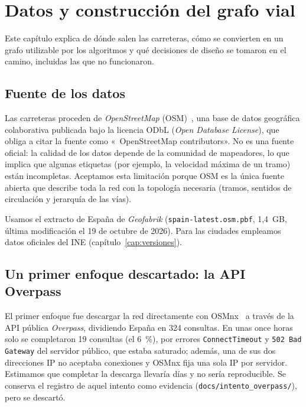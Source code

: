 \chapter{Datos y construcción del grafo vial}\label{cap:grafo}

Este capítulo explica de dónde salen las carreteras, cómo se convierten en un grafo utilizable por los algoritmos y qué decisiones de diseño se tomaron en el
camino, incluidas las que no funcionaron.

\section{Fuente de los datos}

Las carreteras proceden de \emph{OpenStreetMap} (OSM)~\cite{haklay2008}, una base de datos geográfica colaborativa publicada bajo la licencia ODbL (\emph{Open Database License}), que obliga a citar la
fuente como «\textcopyright\ OpenStreetMap contributors». No es una fuente oficial: la calidad de los datos depende de la comunidad de mapeadores, lo que implica
que algunas etiquetas (por ejemplo, la velocidad máxima de un tramo) están incompletas. Aceptamos esta limitación porque OSM es la única fuente abierta que describe toda la red
con la topología necesaria (tramos, sentidos de circulación y jerarquía de las vías).

Usamos el extracto de España de \emph{Geofabrik} (\texttt{spain-latest.osm.pbf}, 1,4~GB, última modificación el 19 de octubre de 2026). Para las ciudades empleamos datos oficiales del INE
(capítulo~\ref{cap:versiones}).

\section{Un primer enfoque descartado: la API Overpass}

El primer enfoque fue descargar la red directamente con OSMnx~\cite{boeing2017} a través de la API pública \emph{Overpass}, dividiendo España en 324 consultas. En unas once horas solo se completaron
19 consultas (el 6~\%), por errores \texttt{ConnectTimeout} y \texttt{502 Bad Gateway} del servidor público, que estaba saturado; además, una de sus dos direcciones IP no aceptaba conexiones y
OSMnx fija una sola IP por servidor. Estimamos que completar la descarga llevaría días y no sería reproducible. Se conserva el registro de aquel intento como evidencia
(\texttt{docs/intento\_overpass/}), pero se descartó.



